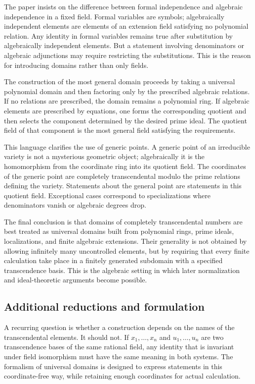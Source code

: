 \documentclass[11pt]{article}
\begin{document}
The paper insists on the difference between formal independence and algebraic independence in a
fixed field. Formal variables are symbols; algebraically independent elements are elements of an
extension field satisfying no polynomial relation. Any identity in formal variables remains true
after substitution by algebraically independent elements. But a statement involving denominators or
algebraic adjunctions may require restricting the substitutions. This is the reason for introducing
domains rather than only fields.


The construction of the most general domain proceeds by taking a universal polynomial domain and
then factoring only by the prescribed algebraic relations. If no relations are prescribed, the
domain remains a polynomial ring. If algebraic elements are prescribed by equations, one forms the
corresponding quotient and then selects the component determined by the desired prime ideal. The
quotient field of that component is the most general field satisfying the requirements.


This language clarifies the use of generic points. A generic point of an irreducible variety is not
a mysterious geometric object; algebraically it is the homomorphism from the coordinate ring into
its quotient field. The coordinates of the generic point are completely transcendental modulo the
prime relations defining the variety. Statements about the general point are statements in this
quotient field. Exceptional cases correspond to specializations where denominators vanish or
algebraic degrees drop.


The final conclusion is that domains of completely transcendental numbers are best treated as
universal domains built from polynomial rings, prime ideals, localizations, and finite algebraic
extensions. Their generality is not obtained by allowing infinitely many uncontrolled elements, but
by requiring that every finite calculation take place in a finitely generated subdomain with a
specified transcendence basis. This is the algebraic setting in which later normalization and
ideal-theoretic arguments become possible.


\subsection{Additional reductions and formulation}

A recurring question is whether a construction depends on the names of the transcendental elements.
It should not. If \(x_1,\ldots,x_n\) and \(u_1,\ldots,u_n\) are two transcendence bases of the same
rational field, any identity that is invariant under field isomorphism must have the same meaning in
both systems. The formalism of universal domains is designed to express statements in this
coordinate-free way, while retaining enough coordinates for actual calculation.
\end{document}

